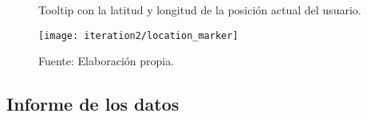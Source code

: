 \begin{figure}[H]
  \begin{center}
    \caption{Tooltip con la latitud y longitud de la posición actual del usuario.}
    \label{fig:location_marker}
    \texttt{[image: iteration2/location\_marker]}
    \caption*{Fuente: Elaboración propia.}
  \end{center}
\end{figure}




\subsection{Informe de los datos}
\label{sub:Informe de los datos}
